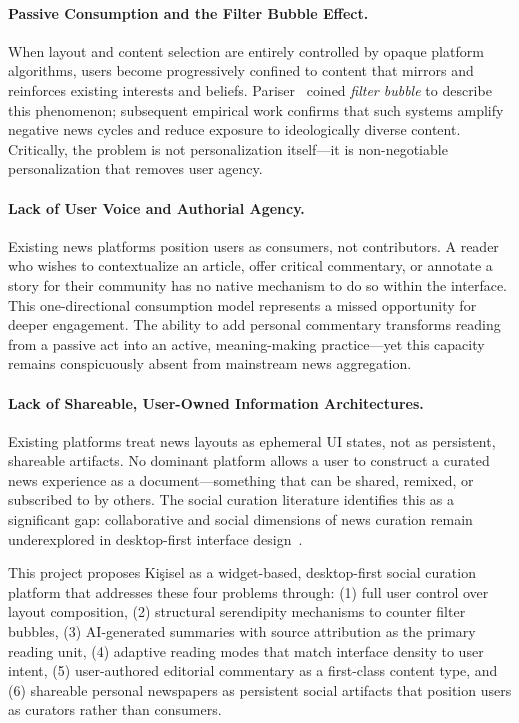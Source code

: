 \documentclass[14pt]{article}
\begin{document}
\paragraph{Passive Consumption and the Filter Bubble Effect.}
When layout and content selection are entirely controlled by opaque platform algorithms, users become progressively confined to content that mirrors and reinforces existing interests and beliefs. Pariser~\cite{pariser2011} coined \emph{filter bubble} to describe this phenomenon; subsequent empirical work confirms that such systems amplify negative news cycles and reduce exposure to ideologically diverse content. Critically, the problem is not personalization itself---it is non-negotiable personalization that removes user agency.

\paragraph{Lack of User Voice and Authorial Agency.}
Existing news platforms position users as consumers, not contributors. A reader who wishes to contextualize an article, offer critical commentary, or annotate a story for their community has no native mechanism to do so within the interface. This one-directional consumption model represents a missed opportunity for deeper engagement. The ability to add personal commentary transforms reading from a passive act into an active, meaning-making practice---yet this capacity remains conspicuously absent from mainstream news aggregation.

\paragraph{Lack of Shareable, User-Owned Information Architectures.}
Existing platforms treat news layouts as ephemeral UI states, not as persistent, shareable artifacts. No dominant platform allows a user to construct a curated news experience as a document---something that can be shared, remixed, or subscribed to by others. The social curation literature identifies this as a significant gap: collaborative and social dimensions of news curation remain underexplored in desktop-first interface design~\cite{schneider2017,villi2012}.

This project proposes Ki\c{s}isel as a widget-based, desktop-first social curation platform that addresses these four problems through: (1) full user control over layout composition, (2) structural serendipity mechanisms to counter filter bubbles, (3) AI-generated summaries with source attribution as the primary reading unit, (4) adaptive reading modes that match interface density to user intent, (5) user-authored editorial commentary as a first-class content type, and (6) shareable personal newspapers as persistent social artifacts that position users as curators rather than consumers.
\end{document}
